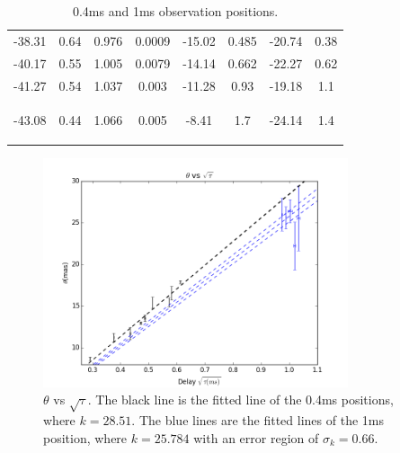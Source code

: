 \documentclass[useAMS,usenatbib]{mn2e}
\begin{document}
\begin{table}
\begin{tabular}{|c|c|c|c|c|c|c|c|}
-38.31                           & 0.64                               & 0.976              & 0.0009                             & -15.02  & 0.485                                    & -20.74   & 0.38                                      \\

-40.17                           & 0.55                               & 1.005              & 0.0079                             & -14.14  & 0.662                                    & -22.27   & 0.62                                     \\

-41.27                           & 0.54                               & 1.037              & 0.003                              & -11.28  & 0.93                                     & -19.18   & 1.1                                      \\

-43.08                           & 0.44                               & 1.066              & 0.005                              & -8.41   & 1.7                                      & -24.14   & 1.4      
                                  
\label{table:apex}
\end{tabular}
\caption{0.4ms and 1ms observation positions.}
\end{table}

\begin{figure}
\centering
\includegraphics[width=0.8\textwidth, angle=0]{Theta_tau.png}
\caption{${\theta}$ vs ${\sqrt{\tau}}$. The black line is the fitted line of the 0.4ms positions, where $k=28.51$. The blue lines are the fitted lines of the 1ms position, where $k=25.784$ with an error region of $\sigma_k=0.66$.
}
\end{figure}
\end{document}

